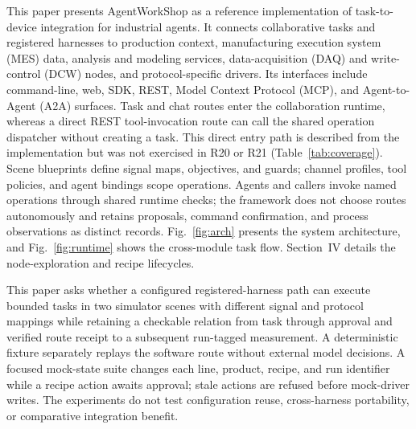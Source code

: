 This paper presents AgentWorkShop as a reference implementation of
task-to-device integration for industrial agents. It connects collaborative tasks
and registered harnesses to production context, manufacturing execution
system (MES) data, analysis and modeling services, data-acquisition (DAQ) and
write-control (DCW) nodes, and protocol-specific drivers. Its interfaces include
command-line, web, SDK, REST, Model Context Protocol (MCP), and Agent-to-Agent
(A2A) surfaces. Task and chat routes enter the
collaboration runtime, whereas a direct REST tool-invocation route can call
the shared operation dispatcher without creating a task. This direct entry
path is described from the implementation but was not exercised in R20 or
R21 (Table~\ref{tab:coverage}).
Scene blueprints define signal maps, objectives, and guards; channel profiles,
tool policies, and agent bindings scope operations. Agents and callers invoke
named operations through shared runtime checks; the framework does not choose
routes autonomously and retains proposals, command confirmation, and process
observations as distinct records. Fig.~\ref{fig:arch} presents the system
architecture, and Fig.~\ref{fig:runtime} shows the cross-module task flow.
Section~IV details the node-exploration and recipe lifecycles.

This paper asks whether a configured registered-harness path can execute
bounded tasks in two simulator scenes with different signal and protocol
mappings while retaining a checkable relation from task through approval and
verified route receipt to a subsequent run-tagged measurement. A deterministic
fixture separately replays the software route without external model
decisions. A focused mock-state suite changes each line, product, recipe, and
run identifier while a recipe action awaits approval; stale actions are
refused before mock-driver writes. The experiments do not test configuration
reuse, cross-harness portability, or comparative integration benefit.

